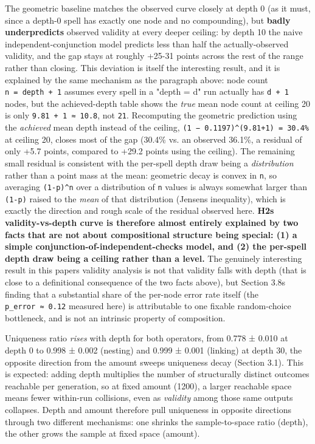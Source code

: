 \documentclass[
  10pt,
  twocolumn]{article}
\begin{document}
The geometric baseline matches the observed curve closely at depth 0 (as
it must, since a depth-0 spell has exactly one node and no compounding),
but \textbf{badly underpredicts} observed validity at every deeper
ceiling: by depth 10 the naive independent-conjunction model predicts
less than half the actually-observed validity, and the gap stays at
roughly +25-31 points across the rest of the range rather than closing.
This deviation is itself the interesting result, and it is explained by
the same mechanism as the paragraph above: node count
\texttt{n\ =\ depth\ +\ 1} assumes every spell in a "depth = d" run
actually has \texttt{d\ +\ 1} nodes, but the achieved-depth table shows
the \emph{true} mean node count at ceiling 20 is only
\texttt{9.81\ +\ 1\ ≈\ 10.8}, not \texttt{21}. Recomputing the geometric
prediction using the \emph{achieved} mean depth instead of the ceiling,
\texttt{(1\ −\ 0.1197)\^{}(9.81+1)\ =\ 30.4\%} at ceiling 20, closes
most of the gap (30.4\% vs. an observed 36.1\%, a residual of only +5.7
points, compared to +29.2 points using the ceiling). The remaining small
residual is consistent with the per-spell depth draw being a
\emph{distribution} rather than a point mass at the mean: geometric
decay is convex in \texttt{n}, so averaging \texttt{(1-p)\^{}n} over a
distribution of \texttt{n} values is always somewhat larger than
\texttt{(1-p)} raised to the \emph{mean} of that distribution
(Jensen\textquotesingle s inequality), which is exactly the direction
and rough scale of the residual observed here.
\textbf{H2\textquotesingle s validity-vs-depth curve is therefore almost
entirely explained by two facts that are not about compositional
structure being special: (1) a simple conjunction-of-independent-checks
model, and (2) the per-spell depth draw being a ceiling rather than a
level.} The genuinely interesting result in this paper\textquotesingle s
validity analysis is not that validity falls with depth (that is close
to a definitional consequence of the two facts above), but Section
3.8\textquotesingle s finding that a substantial share of the per-node
error rate itself (the \texttt{p\_error\ ≈\ 0.12} measured here) is
attributable to one fixable random-choice bottleneck, and is not an
intrinsic property of composition.

Uniqueness ratio \emph{rises} with depth for both operators, from 0.778
± 0.010 at depth 0 to 0.998 ± 0.002 (nesting) and 0.999 ± 0.001
(linking) at depth 30, the opposite direction from the amount
sweep\textquotesingle s uniqueness decay (Section 3.1). This is
expected: adding depth multiplies the number of structurally distinct
outcomes reachable per generation, so at fixed amount (1200), a larger
reachable space means fewer within-run collisions, even as
\emph{validity} among those same outputs collapses. Depth and amount
therefore pull uniqueness in opposite directions through two different
mechanisms: one shrinks the sample-to-space ratio (depth), the other
grows the sample at fixed space (amount).
\end{document}
